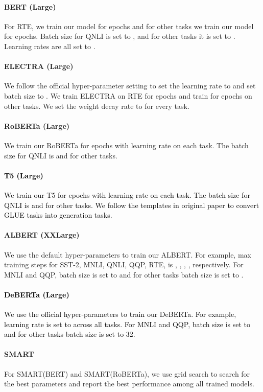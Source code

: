 \documentclass{article}
\newcommand{\m}[1]{{\textcolor{black}{{#1}}}}
\begin{document}
\paragraph{BERT (Large)} For RTE, we train our model for  epochs and for other tasks we train our model for  epochs. Batch size for QNLI is set to , and for other tasks it is set to . Learning rates are all set to .

\paragraph{ELECTRA (Large)} We follow the official hyper-parameter setting to set the learning rate to  and set batch size to . We train ELECTRA on RTE for  epochs and train for  epochs on other tasks. We set the weight decay rate to  for every task.

\paragraph{RoBERTa (Large)} We train our RoBERTa for  epochs with learning rate  on each task. The batch size for QNLI is  and  for other tasks.

\paragraph{\m{T5 (Large)}} \m{We train our T5 for  epochs with learning rate  on each task. The batch size for QNLI is  and  for other tasks. We follow the templates in original paper to convert GLUE tasks into generation tasks.}

\paragraph{ALBERT (XXLarge)} We use the default hyper-parameters to train our ALBERT. For example, max training steps for SST-2, MNLI, QNLI, QQP, RTE, is , , , ,  respectively. For MNLI and QQP, batch size is set to  and for other tasks batch size is set to .

\paragraph{\m{DeBERTa (Large)}} \m{We use the official hyper-parameters to train our DeBERTa. For example, learning rate is set to  across all tasks. For MNLI and QQP, batch size is set to  and for other tasks batch size is set to 32.}

\paragraph{SMART} For SMART(BERT) and SMART(RoBERTa), we use grid search to search for the best parameters and report the best performance among all trained models.
\end{document}
